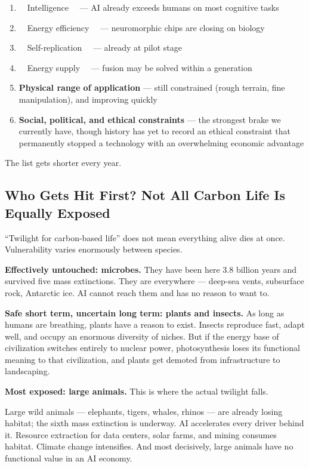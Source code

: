 \documentclass[11pt,a4paper]{article}
\begin{document}
\begin{enumerate}
  \item ~~Intelligence~~ --- AI already exceeds humans on most cognitive tasks
  \item ~~Energy efficiency~~ --- neuromorphic chips are closing on biology
  \item ~~Self-replication~~ --- already at pilot stage
  \item ~~Energy supply~~ --- fusion may be solved within a generation
  \item \textbf{Physical range of application} --- still constrained (rough terrain, fine manipulation), and improving quickly
  \item \textbf{Social, political, and ethical constraints} --- the strongest brake we currently have, though history has yet to record an ethical constraint that permanently stopped a technology with an overwhelming economic advantage
\end{enumerate}

The list gets shorter every year.

\subsection{Who Gets Hit First? Not All Carbon Life Is Equally Exposed}

``Twilight for carbon-based life'' does not mean everything alive dies at once. Vulnerability varies enormously between species.

\textbf{Effectively untouched: microbes.} They have been here 3.8 billion years and survived five mass extinctions. They are everywhere --- deep-sea vents, subsurface rock, Antarctic ice. AI cannot reach them and has no reason to want to.

\textbf{Safe short term, uncertain long term: plants and insects.} As long as humans are breathing, plants have a reason to exist. Insects reproduce fast, adapt well, and occupy an enormous diversity of niches. But if the energy base of civilization switches entirely to nuclear power, photosynthesis loses its functional meaning to that civilization, and plants get demoted from infrastructure to landscaping.

\textbf{Most exposed: large animals.} This is where the actual twilight falls.

Large wild animals --- elephants, tigers, whales, rhinos --- are already losing habitat; the sixth mass extinction is underway. AI accelerates every driver behind it. Resource extraction for data centers, solar farms, and mining consumes habitat. Climate change intensifies. And most decisively, large animals have no functional value in an AI economy.
\end{document}
